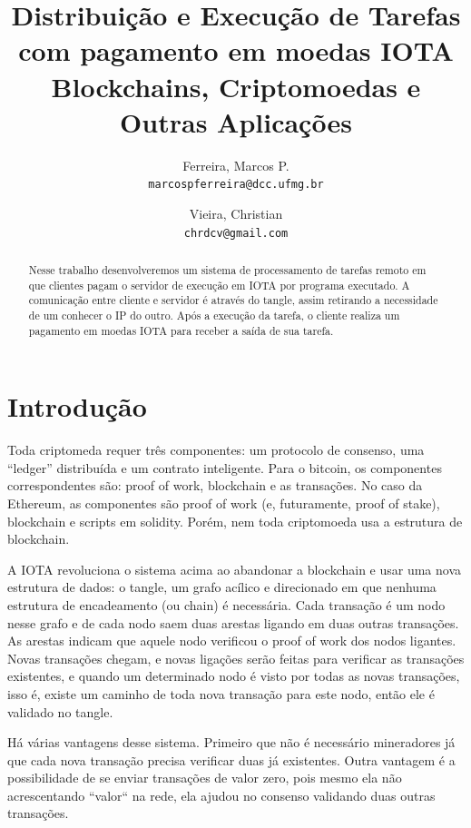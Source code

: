 \documentclass[a4paper]{article}
\begin{document}
\title{%
  Distribuição e Execução de Tarefas com pagamento em moedas IOTA \\
  \large Blockchains, Criptomoedas e Outras Aplicações}
    
\author{
  Ferreira, Marcos P.\\
  \texttt{marcospferreira@dcc.ufmg.br}
  \and
  Vieira, Christian \\
  \texttt{chrdcv@gmail.com}
}

\maketitle

\begin{abstract}
Nesse trabalho desenvolveremos um sistema de processamento de tarefas remoto em que clientes pagam o servidor
de execução em IOTA por programa executado. A comunicação entre cliente e servidor é através do tangle, assim
retirando a necessidade de um conhecer o IP do outro. Após a execução da tarefa, o cliente realiza um pagamento
em moedas IOTA para receber a saída de sua tarefa.
\end{abstract}

\section{Introdução}\label{sec:Introduction}

Toda criptomeda requer três componentes: um protocolo de consenso, uma ``ledger'' distribuída e um contrato inteligente.
Para o bitcoin, os componentes correspondentes são: proof of work, blockchain e as transações. No caso da Ethereum, as
componentes são proof of work (e, futuramente, proof of stake), blockchain e scripts em solidity. Porém, nem toda criptomoeda
usa a estrutura de blockchain.

A IOTA revoluciona o sistema acima ao abandonar a blockchain e usar uma nova estrutura de dados: o tangle, um grafo acílico
e direcionado em que nenhuma estrutura de encadeamento (ou chain) é necessária. Cada transação é um nodo nesse grafo e de
cada nodo saem duas arestas ligando em duas outras transações. As arestas indicam que aquele nodo verificou o proof of work
dos nodos ligantes. Novas transações chegam, e novas ligações serão feitas para verificar as transações existentes, e quando
um determinado nodo é visto por todas as novas transações, isso é, existe um caminho de toda nova transação para este
nodo, então ele é validado no tangle.

Há várias vantagens desse sistema. Primeiro que não é necessário mineradores já que cada nova transação precisa verificar
duas já existentes. Outra vantagem é a possibilidade de se enviar transações de valor zero, pois mesmo ela não acrescentando
``valor`` na rede, ela ajudou no consenso validando duas outras transações.
\end{document}
